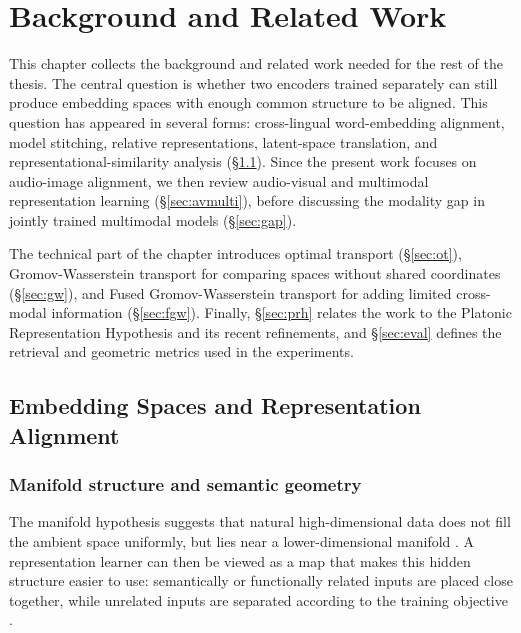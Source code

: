 \chapter{Background and Related Work}

This chapter collects the background and related work needed for the rest of the thesis. The central question is whether two encoders trained separately can still produce embedding spaces with enough common structure to be aligned. This question has appeared in several forms: cross-lingual word-embedding alignment, model stitching, relative representations, latent-space translation, and representational-similarity analysis (\S\ref{sec:repr}). Since the present work focuses on audio-image alignment, we then review audio-visual and multimodal representation learning (\S\ref{sec:avmulti}), before discussing the modality gap in jointly trained multimodal models (\S\ref{sec:gap}).

The technical part of the chapter introduces optimal transport (\S\ref{sec:ot}), Gromov-Wasserstein transport for comparing spaces without shared coordinates (\S\ref{sec:gw}), and Fused Gromov-Wasserstein transport for adding limited cross-modal information (\S\ref{sec:fgw}). Finally, \S\ref{sec:prh} relates the work to the Platonic Representation Hypothesis and its recent refinements, and \S\ref{sec:eval} defines the retrieval and geometric metrics used in the experiments.

\section{Embedding Spaces and Representation Alignment}
\label{sec:repr}
\subsection{Manifold structure and semantic geometry}

The manifold hypothesis suggests that natural high-dimensional data does not fill the ambient space uniformly, but lies near a lower-dimensional manifold \cite{tenenbaum2000isomap,roweis2000lle}. A representation learner can then be viewed as a map that makes this hidden structure easier to use: semantically or functionally related inputs are placed close together, while unrelated inputs are separated according to the training objective \cite{bengio2013representation}.

